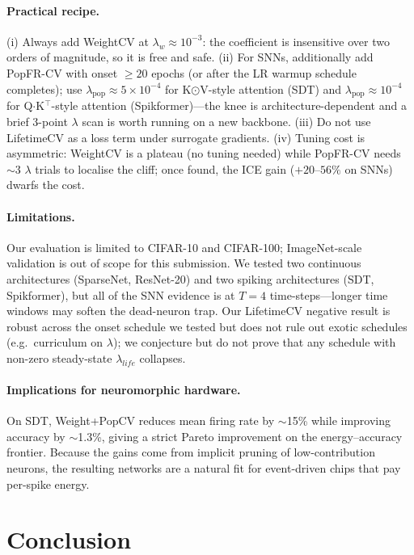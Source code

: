 \documentclass{article}
\begin{document}
\paragraph{Practical recipe.} (i) Always add WeightCV at $\lambda_w \approx 10^{-3}$: the coefficient is insensitive over two orders of magnitude, so it is free and safe. (ii) For SNNs, additionally add PopFR-CV with onset $\geq 20$ epochs (or after the LR warmup schedule completes); use $\lambda_{\text{pop}}\!\approx\!5\!\times\!10^{-4}$ for K$\odot$V-style attention (SDT) and $\lambda_{\text{pop}}\!\approx\!10^{-4}$ for Q$\cdot$K$^\top$-style attention (Spikformer)---the knee is architecture-dependent and a brief 3-point $\lambda$ scan is worth running on a new backbone. (iii) Do not use LifetimeCV as a loss term under surrogate gradients. (iv) Tuning cost is asymmetric: WeightCV is a plateau (no tuning needed) while PopFR-CV needs $\sim 3$ $\lambda$ trials to localise the cliff; once found, the ICE gain ($+20$--$56\%$ on SNNs) dwarfs the cost.

\paragraph{Limitations.} Our evaluation is limited to CIFAR-10 and CIFAR-100; ImageNet-scale validation is out of scope for this submission. We tested two continuous architectures (SparseNet, ResNet-20) and two spiking architectures (SDT, Spikformer), but all of the SNN evidence is at $T{=}4$ time-steps---longer time windows may soften the dead-neuron trap. Our LifetimeCV negative result is robust across the onset schedule we tested but does not rule out exotic schedules (e.g.\ curriculum on $\lambda$); we conjecture but do not prove that any schedule with non-zero steady-state $\lambda_{life}$ collapses.

\paragraph{Implications for neuromorphic hardware.} On SDT, Weight+PopCV reduces mean firing rate by $\sim$15\% while improving accuracy by $\sim$1.3\%, giving a strict Pareto improvement on the energy--accuracy frontier. Because the gains come from implicit pruning of low-contribution neurons, the resulting networks are a natural fit for event-driven chips that pay per-spike energy.

\section{Conclusion}
\label{sec:conclusion}
\end{document}
